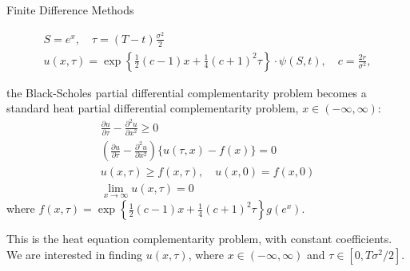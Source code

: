 \documentclass{beamer}
\begin{document}
\begin{frame}{Finite Difference Methods}

    {\footnotesize \footnotesize
    \vspace{-2em}
    \begin{gather*}
        S = e^x, \quad \tau = (T - t) \frac{\sigma^2}{2}\\
        u(x,\tau) = \exp\left\{ \frac{1}{2} (c - 1)x +
         \frac{1}{4} (c + 1)^2 \tau \right\} \cdot \psi(S,t), \quad c = \frac{2r}{\sigma^2},
    \end{gather*}
    
        the Black-Scholes partial differential complementarity problem becomes 
        a standard heat partial differential complementarity problem, $x \in (-\infty, \infty)$:
         \pause \begin{gather*}
            \frac{\partial u}{\partial \tau} - \frac{\partial^2 u}{\partial x^2} \geq 0\\
            \left( \frac{\partial u}{\partial \tau} - \frac{\partial^2 u}{\partial x^2} \right) \{u(\tau, x) - f(x)\} = 0\\
            u(x, \tau) \geq f(x, \tau), \quad u(x, 0) = f(x, 0) \\
            \lim_{x \to \infty} u(x, \tau) = 0
        \end{gather*}
        where $f(x, \tau) = \exp \left\{ \frac{1}{2} (c-1)x + \frac{1}{4} (c+1)^2 \tau \right\} g(e^x)$.
        
        This is the heat equation complementarity problem, with constant coefficients. 
        We are interested in finding $u(x, \tau)$, where
        $x \in (-\infty, \infty)$ and $\tau \in [0, T\sigma^2/2]$.
        }
    
\end{frame}
\end{document}
